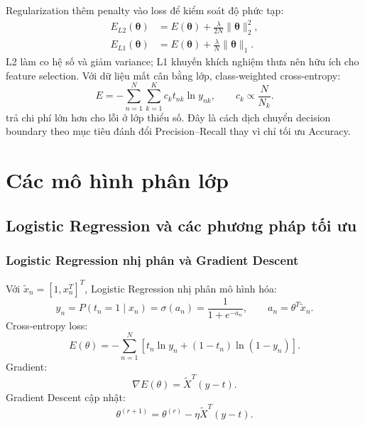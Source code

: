 \documentclass[12pt,a4paper]{article}
\begin{document}
Regularization thêm penalty vào loss để kiểm soát độ phức tạp:
\begin{align}
  E_{L2}(\boldsymbol{\theta})
  &=E(\boldsymbol{\theta})+\frac{\lambda}{2N}\|\boldsymbol{\theta}\|_2^2, \\
  E_{L1}(\boldsymbol{\theta})
  &=E(\boldsymbol{\theta})+\frac{\lambda}{N}\|\boldsymbol{\theta}\|_1.
  \label{eq:cls_regularization}
\end{align}
L2 làm co hệ số và giảm variance; L1 khuyến khích nghiệm thưa nên hữu ích cho
feature selection. Với dữ liệu mất cân bằng lớp, class-weighted cross-entropy:
\begin{equation}
  E=-\sum_{n=1}^{N}\sum_{k=1}^{K}c_k t_{nk}\ln y_{nk},
  \qquad
  c_k\propto\frac{N}{N_k}.
  \label{eq:cls_class_weight}
\end{equation}
trả chi phí lớn hơn cho lỗi ở lớp thiểu số. Đây là cách dịch chuyển decision
boundary theo mục tiêu đánh đổi Precision--Recall thay vì chỉ tối ưu Accuracy.

\section{Các mô hình phân lớp}

\subsection{Logistic Regression và các phương pháp tối ưu}

\subsubsection{Logistic Regression nhị phân và Gradient Descent}

Với $\tilde{x}_n=[1,x_n^T]^T$, Logistic Regression nhị phân mô hình hóa:
\begin{equation}
 y_n=P(t_n=1\mid x_n)=\sigma(a_n)=\frac{1}{1+e^{-a_n}}, \qquad a_n=\theta^T\tilde{x}_n.
\end{equation}
Cross-entropy loss:
\begin{equation}
 E(\theta)=-\sum_{n=1}^{N}\left[t_n\ln y_n+(1-t_n)\ln(1-y_n)\right].
\end{equation}
Gradient:
\begin{equation}
 \nabla E(\theta)=\tilde{X}^{T}(y-t).
\end{equation}
Gradient Descent cập nhật:
\begin{equation}
 \theta^{(r+1)}=\theta^{(r)}-\eta\tilde{X}^{T}(y-t).
\end{equation}
\end{document}
